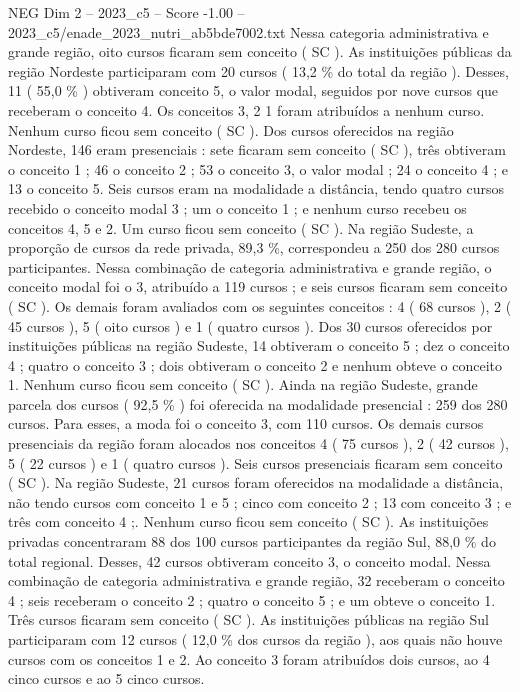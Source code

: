 \begin{textsample}{NEG Dim 2 – 2023\_c5 – Score -1.00 – 2023\_c5/enade\_2023\_nutri\_ab5bde7002.txt}
Nessa categoria administrativa e grande região, oito cursos ficaram sem conceito ( SC ).
As instituições públicas da região Nordeste participaram com 20 cursos ( 13,2 \% do total da região ).
Desses, 11 ( 55,0 \% ) obtiveram conceito 5, o valor modal, seguidos por nove cursos que receberam o conceito 4.
Os conceitos 3, 2 1 foram atribuídos a nenhum curso.
Nenhum curso ficou sem conceito ( SC ).
Dos cursos oferecidos na região Nordeste, 146 eram presenciais : sete ficaram sem conceito ( SC ), três obtiveram o conceito 1 ; 46 o conceito 2 ; 53 o conceito 3, o valor modal ; 24 o conceito 4 ; e 13 o conceito 5.
Seis cursos eram na modalidade a distância, tendo quatro cursos recebido o conceito modal 3 ; um o conceito 1 ; e nenhum curso recebeu os conceitos 4, 5 e 2.
Um curso ficou sem conceito ( SC ).
Na região Sudeste, a proporção de cursos da rede privada, 89,3 \%, correspondeu a 250 dos 280 cursos participantes.
Nessa combinação de categoria administrativa e grande região, o conceito modal foi o 3, atribuído a 119 cursos ; e seis cursos ficaram sem conceito ( SC ).
Os demais foram avaliados com os seguintes conceitos : 4 ( 68 cursos ), 2 ( 45 cursos ), 5 ( oito cursos ) e 1 ( quatro cursos ).
Dos 30 cursos oferecidos por instituições públicas na região Sudeste, 14 obtiveram o conceito 5 ; dez o conceito 4 ; quatro o conceito 3 ; dois obtiveram o conceito 2 e nenhum obteve o conceito 1.
Nenhum curso ficou sem conceito ( SC ).
Ainda na região Sudeste, grande parcela dos cursos ( 92,5 \% ) foi oferecida na modalidade presencial : 259 dos 280 cursos.
Para esses, a moda foi o conceito 3, com 110 cursos.
Os demais cursos presenciais da região foram alocados nos conceitos 4 ( 75 cursos ), 2 ( 42 cursos ), 5 ( 22 cursos ) e 1 ( quatro cursos ).
Seis cursos presenciais ficaram sem conceito ( SC ).
Na região Sudeste, 21 cursos foram oferecidos na modalidade a distância, não tendo cursos com conceito 1 e 5 ; cinco com conceito 2 ; 13 com conceito 3 ; e três com conceito 4 ;.
Nenhum curso ficou sem conceito ( SC ).
As instituições privadas concentraram 88 dos 100 cursos participantes da região Sul, 88,0 \% do total regional.
Desses, 42 cursos obtiveram conceito 3, o conceito modal.
Nessa combinação de categoria administrativa e grande região, 32 receberam o conceito 4 ; seis receberam o conceito 2 ; quatro o conceito 5 ; e um obteve o conceito 1.
Três cursos ficaram sem conceito ( SC ).
As instituições públicas na região Sul participaram com 12 cursos ( 12,0 \% dos cursos da região ), aos quais não houve cursos com os conceitos 1 e 2.
Ao conceito 3 foram atribuídos dois cursos, ao 4 cinco cursos e ao 5 cinco cursos.

\end{textsample}
